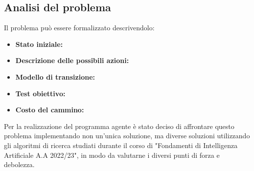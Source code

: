 \subsection{Analisi del problema}
Il problema può essere formalizzato descrivendolo: 
\begin{itemize}
\item \textbf{Stato iniziale:} 
\item \textbf{Descrizione delle possibili azioni:} 
\item \textbf{Modello di transizione:}
\item \textbf{Test obiettivo:} 
\item \textbf{Costo del cammino:} 
\end{itemize}

Per la realizzazione del programma agente è stato deciso di affrontare questo problema implementando non un'unica soluzione, ma diverse soluzioni utilizzando gli algoritmi di ricerca studiati durante il corso di "Fondamenti di Intelligenza Artificiale A.A 2022/23", in modo da valutarne i diversi punti di forza e debolezza. 
